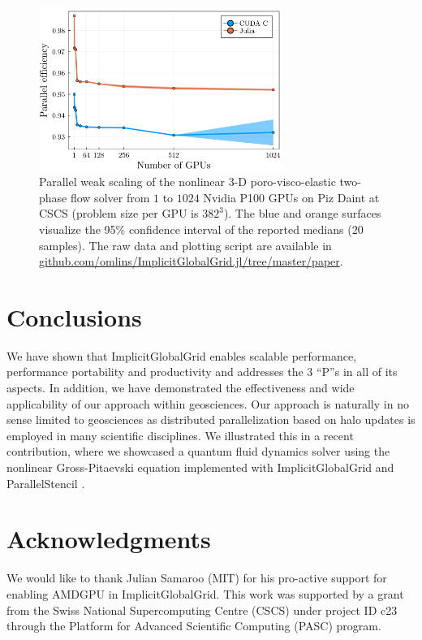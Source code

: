 \documentclass{juliacon}
\begin{document}
\begin{figure}[t]
    \centerline{\includegraphics[width=8cm]{julia_c_gpu_par_eff_lin.png}}
    \caption{Parallel weak scaling of the nonlinear 3-D poro-visco-elastic two-phase flow solver from $1$ to $1024$ Nvidia P100 GPUs on Piz Daint at CSCS (problem size per GPU is $382^\mathrm{3}$). The blue and orange surfaces visualize the 95\% confidence interval of the reported medians (20 samples). The raw data and plotting script are available in \url{github.com/omlins/ImplicitGlobalGrid.jl/tree/master/paper}.}
	\label{fig:weak_scaling_realworld}
\end{figure}

\section{Conclusions}
We have shown that ImplicitGlobalGrid enables scalable performance, performance portability and productivity and addresses the 3 ``P''s in all of its aspects. In addition, we have demonstrated the effectiveness and wide applicability of our approach within geosciences. Our approach is naturally in no sense limited to geosciences as distributed parallelization based on halo updates is employed in many scientific disciplines. We illustrated this in a recent contribution, where we showcased a quantum fluid dynamics solver using the nonlinear Gross-Pitaevski equation implemented with ImplicitGlobalGrid and ParallelStencil \cite{pasc21}.

\section{Acknowledgments}
We would like to thank Julian Samaroo (MIT) for his pro-active support for enabling AMDGPU in ImplicitGlobalGrid. This work was supported by a grant from the Swiss National Supercomputing Centre (CSCS) under project ID c23 through the Platform for Advanced Scientific Computing (PASC) program.


\end{document}

